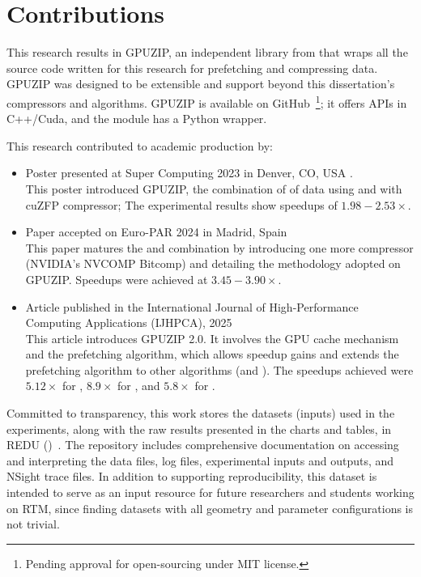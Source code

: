 \documentclass[Ingles,Final]{ic-tese-v3}
\begin{document}
\section{Contributions}
This research results in GPUZIP, an independent library from \awave that wraps all the source code written for this research for prefetching and compressing \checkpointing data. GPUZIP was designed to be extensible and support beyond this dissertation's compressors and \checkpointing algorithms. GPUZIP is available on GitHub~\cite{githubrepo}\footnote{Pending approval for open-sourcing under MIT license.}; it offers APIs in C++/Cuda, and the \compression module has a Python wrapper.

This research contributed to academic production by:
\begin{itemize}
    \item Poster presented at Super Computing 2023 in Denver, CO, USA \cite{sc23}. \\
    This poster introduced GPUZIP, the combination of \prefetching of \checkpointing data using \revolve and \compression with cuZFP compressor; The experimental results show speedups of $1.98 - 2.53\times$.
    
    \item Paper accepted on Euro-PAR 2024 in Madrid, Spain \cite{europar} \\
    This paper matures the \prefetching and \compression combination by introducing one more compressor (NVIDIA's NVCOMP Bitcomp) and detailing the methodology adopted on GPUZIP. Speedups were achieved at $3.45 - 3.90\times$.
    
    \item Article published in the International Journal of High-Performance Computing Applications (IJHPCA), 2025 \cite{ijhpca} \\
    This article introduces GPUZIP 2.0. It involves the GPU cache mechanism and the prefetching algorithm, which allows speedup gains and extends the prefetching algorithm to other \checkpointing algorithms (\zcut and \uniform). The speedups achieved were $5.12\times$ for \revolve, $8.9\times$ for \zcut, and $5.8\times$ for \uniform.
\end{itemize}

Committed to transparency, this work stores the datasets (inputs) used in the experiments, along with the raw results presented in the charts and tables, in REDU ()~\cite{ds}. The repository includes comprehensive documentation on accessing and interpreting the data files, log files, experimental inputs and outputs, and NSight trace files. In addition to supporting reproducibility, this dataset is intended to serve as an input resource for future researchers and students working on RTM, since finding datasets with all geometry and parameter configurations is not trivial.
\end{document}
